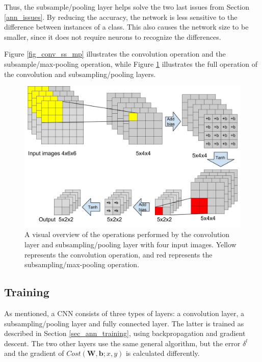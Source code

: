 Thus, the subsample/pooling layer helps solve the two last issues from Section \ref{ann_issues}. By reducing the accuracy, the network is less sensitive to the difference between instances of a class. This also causes the network size to be smaller, since it does not require neurons to recognize the differences. 

Figure \ref{fig_conv_ss_mp} illustrates the convolution operation and the subsample/max-pooling operation, while Figure \ref{fig_visual_conv_ss_mp} illustrates the full operation of the convolution and subsampling/pooling layers. 

\begin{figure}[h!]
  \centering
      \includegraphics[width=1.0\textwidth]{Figures/Background/Convolution_subsample_pool}
  \caption[Convolutional layer operation]{A visual overview of the operations performed by the convolution layer and subsampling/pooling layer with four input images. Yellow represents the convolution operation, and red represents the subsampling/max-pooling operation.}
  \label{fig_visual_conv_ss_mp}
\end{figure}



\subsection{Training} \label{sec_cnn_training}
As mentioned, a CNN consists of three types of layers: a convolution layer, a subsampling/pooling layer and fully connected layer. The latter is trained as described in Section \ref{sec_ann_training}, using backpropagation and gradient descent. The two other layers use the same general algorithm, but the error $ \delta^l $ and the gradient of $ Cost(\mathbf{W,b}; x, y) $ is calculated differently. 

